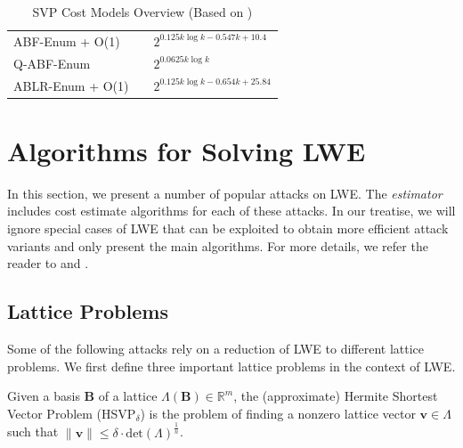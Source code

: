 \begin{table}
\begin{tabular}{lll}
    ABF-Enum + O(1)                  & \cite{ABFKSW20}                 & $2^{0.125k \log k - 0.547k + 10.4}$   \\
    Q-ABF-Enum                       & \cite{ABFKSW20}                 & $2^{0.0625 k \log k}$                 \\
    ABLR-Enum + O(1)                 & \cite{ABLR21}                   & $2^{0.125k \log k - 0.654k + 25.84}$  \\
    \bottomrule
  \end{tabular}
  \caption[SVP Cost Models Overview]{SVP Cost Models Overview (Based on \cite[Table~4]{ACDDPPVW18})} %
  \label{tab:costmodels}
\end{table} %










\section{Algorithms for Solving LWE}
In this section, we present a number of popular attacks on LWE. The \textit{estimator} includes cost estimate algorithms for each of these attacks. In our treatise, we will ignore special cases of LWE that can be exploited to obtain more efficient attack variants and only present the main algorithms. For more details, we refer the reader to \cite{APS15} and \cite{BBGS19}.

\subsection{Lattice Problems}
Some of the following attacks rely on a reduction of LWE to different lattice problems. We first define three important lattice problems in the context of LWE.

\begin{definition} \label{def:hsvp}
  Given a basis $\mathbf{B}$ of a lattice $\Lambda(\mathbf{B}) \in \mathbb{R}^m$, the (approximate)  Hermite Shortest Vector Problem (HSVP$_\delta$) is the problem of finding a nonzero lattice vector $\mathbf{v} \in \Lambda$ such that $\| \mathbf{v} \| \leq \delta \cdot \text{det}(\Lambda)^{\frac{1}{n}}$.
\end{definition}

